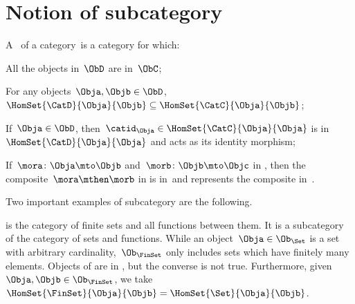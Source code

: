 \label{sec:specialization}


\section{Notion of subcategory}
\begin{ctdefinition}[Subcategory]
    \label{def:subcategory}
    A \emph{}~\CatD of a category~\CatC is a category for which:
    \begin{compactenum}
        \item All the objects in~$\ObD$ are in~$\ObC$;
        \item For any objects~$\Obja,\Objb\in \ObD$,~$\HomSet{\CatD}{\Obja}{\Objb}\subseteq \HomSet{\CatC}{ \Obja}{\Objb}$;
        \item If~$\Obja\in \ObD$, then~$\catid_\Obja \in \HomSet{\CatC}{\Obja}{\Obja}$ is in~$\HomSet{\CatD}{\Obja}{\Obja}$ and acts as its identity morphism;
        \item If~$\mora \colon \Obja \mto \Objb$ and~$\morb\colon \Objb\mto \Objc$ in \CatD, then the composite~$\mora \mthen \morb$ in \CatC is in~\CatD and represents the composite in~\CatD.
    \end{compactenum}
\end{ctdefinition}

Two important examples of subcategory are the following.

\begin{example}
    \label{ex:FinSet}
    \iindex{\FinSet} is the category of finite sets and all functions between them.
    It is a subcategory of the category \Set of sets and functions.
    While an object~$\Obja \in \Ob_\Set$ is a set with arbitrary cardinality,~$\Ob_{\FinSet}$ only includes sets which have finitely many elements.
    Objects of \FinSet are in \Set, but the converse is not true.
    Furthermore, given~$\Obja,\Objb\in \Ob_\FinSet$, we take~$\HomSet{\FinSet}{\Obja}{\Objb} =\HomSet{\Set}{\Obja}{\Objb}$.
\end{example}

